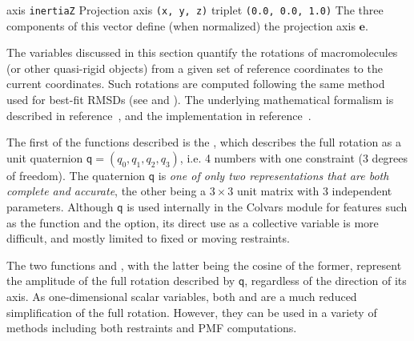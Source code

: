 \begin{cvcoptions}
\item %
\item %
  \keydef
    {axis}{%
    \texttt{inertiaZ}}{%
    Projection axis}{%
    \texttt{(x, y, z)} triplet}{%
    \texttt{(0.0, 0.0, 1.0)}}{%
    The three components of this vector define (when normalized) the
    projection axis $\mathbf{e}$.}
\end{cvcoptions}



The variables discussed in this section quantify the rotations of macromolecules (or other quasi-rigid objects) from a given set of reference coordinates to the current coordinates.
Such rotations are computed following the same method used for best-fit RMSDs (see  and ).
The underlying mathematical formalism is described in reference~\cite{Coutsias2004}, and the implementation in reference~\cite{Fiorin2013}.

The first of the functions described is the , which describes the full rotation as a unit quaternion $\mathsf{q} = (q_0, q_1, q_2, q_3)$, i.e.{} 4 numbers with one constraint (3 degrees of freedom).
The quaternion $\mathsf{q}$ is \emph{one of only two representations that are both complete and accurate}, the other being a $3\times{}3$ unit matrix with 3 independent parameters.
Although $\mathsf{q}$ is used internally in the Colvars module for features such as the  function and the  option, its direct use as a collective variable is more difficult, and mostly limited to fixed or moving restraints.

The two functions  and , with the latter being the cosine of the former, represent the amplitude of the full rotation described by $\mathsf{q}$, regardless of the direction of its axis.
As one-dimensional scalar variables, both  and  are a much reduced simplification of the full rotation.
However, they can be used in a variety of methods including both restraints and PMF computations.

